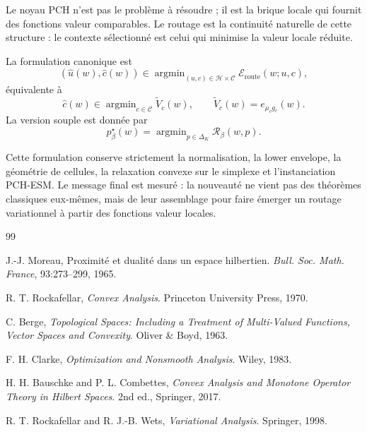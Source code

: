 \documentclass[11pt,a4paper]{article}
\DeclareMathOperator{\argmin}{argmin}
\newcommand{\Hh}{\mathcal H}
\newcommand{\Ccal}{\mathcal C}
\newcommand{\Rcal}{\mathcal R}
\begin{document}
Le noyau PCH n'est pas le problème à résoudre ; il est la brique locale qui fournit des fonctions valeur comparables. Le routage est la continuité naturelle de cette structure : le contexte sélectionné est celui qui minimise la valeur locale réduite.

La formulation canonique est
\[
(\hat u(w),\hat c(w))\in\argmin_{(u,c)\in\Hh\times\Ccal}\mathcal E_{\mathrm{route}}(w;u,c),
\]
équivalente à
\[
\hat c(w)\in\argmin_{c\in\Ccal}\widetilde V_c(w),
\qquad
\widetilde V_c(w)=e_{\mu_c g_c}(w).
\]
La version souple est donnée par
\[
p^\star_\beta(w)=\argmin_{p\in\Delta_K}\Rcal_\beta(w,p).
\]

Cette formulation conserve strictement la normalisation, la lower envelope, la géométrie de cellules, la relaxation convexe sur le simplexe et l'instanciation PCH-ESM. Le message final est mesuré : la nouveauté ne vient pas des théorèmes classiques eux-mêmes, mais de leur assemblage pour faire émerger un routage variationnel à partir des fonctions valeur locales.

\begin{thebibliography}{99}

J.-J. Moreau,
\newblock Proximité et dualité dans un espace hilbertien.
\newblock \emph{Bull. Soc. Math. France}, 93:273--299, 1965.

R. T. Rockafellar,
\newblock \emph{Convex Analysis}.
\newblock Princeton University Press, 1970.

C. Berge,
\newblock \emph{Topological Spaces: Including a Treatment of Multi-Valued Functions, Vector Spaces and Convexity}.
\newblock Oliver \& Boyd, 1963.

F. H. Clarke,
\newblock \emph{Optimization and Nonsmooth Analysis}.
\newblock Wiley, 1983.

H. H. Bauschke and P. L. Combettes,
\newblock \emph{Convex Analysis and Monotone Operator Theory in Hilbert Spaces}.
\newblock 2nd ed., Springer, 2017.

R. T. Rockafellar and R. J.-B. Wets,
\newblock \emph{Variational Analysis}.
\newblock Springer, 1998.

\end{thebibliography}
\end{document}
